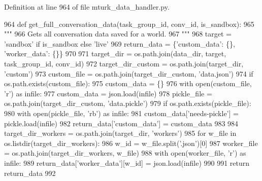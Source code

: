 Definition at line 964 of file mturk\+\_\+data\+\_\+handler.\+py.


\begin{DoxyCode}
964     \textcolor{keyword}{def }get\_full\_conversation\_data(task\_group\_id, conv\_id, is\_sandbox):
965         \textcolor{stringliteral}{"""}
966 \textcolor{stringliteral}{        Gets all conversation data saved for a world.}
967 \textcolor{stringliteral}{        """}
968         target = \textcolor{stringliteral}{'sandbox'} \textcolor{keywordflow}{if} is\_sandbox \textcolor{keywordflow}{else} \textcolor{stringliteral}{'live'}
969         return\_data = \{\textcolor{stringliteral}{'custom\_data'}: \{\}, \textcolor{stringliteral}{'worker\_data'}: \{\}\}
970 
971         target\_dir = os.path.join(data\_dir, target, task\_group\_id, conv\_id)
972         target\_dir\_custom = os.path.join(target\_dir, \textcolor{stringliteral}{'custom'})
973         custom\_file = os.path.join(target\_dir\_custom, \textcolor{stringliteral}{'data.json'})
974         \textcolor{keywordflow}{if} os.path.exists(custom\_file):
975             custom\_data = \{\}
976             with open(custom\_file, \textcolor{stringliteral}{'r') as infile:}
977 \textcolor{stringliteral}{                custom\_data = json.load(infile)}
978 \textcolor{stringliteral}{            pickle\_file = os.path.join(target\_dir\_custom, 'data.pickle'})
979             \textcolor{keywordflow}{if} os.path.exists(pickle\_file):
980                 with open(pickle\_file, \textcolor{stringliteral}{'rb'}) \textcolor{keyword}{as} infile:
981                     custom\_data[\textcolor{stringliteral}{'needs-pickle'}] = pickle.load(infile)
982             return\_data[\textcolor{stringliteral}{'custom\_data'}] = custom\_data
983 
984         target\_dir\_workers = os.path.join(target\_dir, \textcolor{stringliteral}{'workers'})
985         \textcolor{keywordflow}{for} w\_file \textcolor{keywordflow}{in} os.listdir(target\_dir\_workers):
986             w\_id = w\_file.split(\textcolor{stringliteral}{'.json'})[0]
987             worker\_file = os.path.join(target\_dir\_workers, w\_file)
988             with open(worker\_file, \textcolor{stringliteral}{'r') as infile:}
989 \textcolor{stringliteral}{                return\_data['worker\_data'}][w\_id] = json.load(infile)
990 
991         \textcolor{keywordflow}{return} return\_data
992 \end{DoxyCode}
\mbox{\label{classparlai_1_1mturk_1_1core_1_1mturk__data__handler_1_1MTurkDataHandler_a753c4a107539e6085fb2fd8402ed35e2}} 
